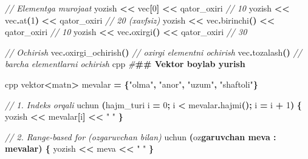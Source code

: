 \documentclass[a4paper,11pt,twoside,openright]{book}
\newenvironment{Shaded}{\begin{snugshade}}{\end{snugshade}}
\newcommand{\CharTok}[1]{\textcolor[rgb]{0.31,0.60,0.02}{#1}}
\newcommand{\CommentTok}[1]{\textcolor[rgb]{0.56,0.35,0.01}{\textit{#1}}}
\newcommand{\DecValTok}[1]{\textcolor[rgb]{0.00,0.00,0.81}{#1}}
\newcommand{\ErrorTok}[1]{\textcolor[rgb]{0.64,0.00,0.00}{\textbf{#1}}}
\newcommand{\NormalTok}[1]{#1}
\newcommand{\OperatorTok}[1]{\textcolor[rgb]{0.81,0.36,0.00}{\textbf{#1}}}
\newcommand{\PreprocessorTok}[1]{\textcolor[rgb]{0.56,0.35,0.01}{\textit{#1}}}
\newcommand{\StringTok}[1]{\textcolor[rgb]{0.31,0.60,0.02}{#1}}
\begin{document}
\begin{Shaded}
\begin{Highlighting}[]
\CommentTok{// Elementga murojaat}
\NormalTok{yozish }\OperatorTok{\textless{}\textless{}}\NormalTok{ vec}\OperatorTok{[}\DecValTok{0}\OperatorTok{]} \OperatorTok{\textless{}\textless{}}\NormalTok{ qator\_oxiri          }\CommentTok{// 10}
\NormalTok{yozish }\OperatorTok{\textless{}\textless{}}\NormalTok{ vec}\OperatorTok{.}\NormalTok{at}\OperatorTok{(}\DecValTok{1}\OperatorTok{)} \OperatorTok{\textless{}\textless{}}\NormalTok{ qator\_oxiri       }\CommentTok{// 20 (xavfsiz)}
\NormalTok{yozish }\OperatorTok{\textless{}\textless{}}\NormalTok{ vec}\OperatorTok{.}\NormalTok{birinchi}\OperatorTok{()} \OperatorTok{\textless{}\textless{}}\NormalTok{ qator\_oxiri  }\CommentTok{// 10}
\NormalTok{yozish }\OperatorTok{\textless{}\textless{}}\NormalTok{ vec}\OperatorTok{.}\NormalTok{oxirgi}\OperatorTok{()} \OperatorTok{\textless{}\textless{}}\NormalTok{ qator\_oxiri    }\CommentTok{// 30}

\CommentTok{// O\textquotesingle{}chirish}
\NormalTok{vec}\OperatorTok{.}\NormalTok{oxirgi\_ochirish}\OperatorTok{()}          \CommentTok{// oxirgi elementni o\textquotesingle{}chirish}
\NormalTok{vec}\OperatorTok{.}\NormalTok{tozalash}\OperatorTok{()}                 \CommentTok{// barcha elementlarni o\textquotesingle{}chirish}
\ErrorTok{\textasciigrave{}\textasciigrave{}\textasciigrave{}}\NormalTok{cpp}
\PreprocessorTok{\#}\ErrorTok{\#\# Vektor bo\textquotesingle{}ylab yurish}

\ErrorTok{\textasciigrave{}\textasciigrave{}\textasciigrave{}}\NormalTok{cpp}
\NormalTok{vektor}\OperatorTok{\textless{}}\NormalTok{matn}\OperatorTok{\textgreater{}}\NormalTok{ mevalar }\OperatorTok{=} \OperatorTok{\{}\StringTok{"olma"}\OperatorTok{,} \StringTok{"anor"}\OperatorTok{,} \StringTok{"uzum"}\OperatorTok{,} \StringTok{"shaftoli"}\OperatorTok{\}}

\CommentTok{// 1. Indeks orqali}
\NormalTok{uchun }\OperatorTok{(}\NormalTok{hajm\_turi i }\OperatorTok{=} \DecValTok{0}\OperatorTok{;}\NormalTok{ i }\OperatorTok{\textless{}}\NormalTok{ mevalar}\OperatorTok{.}\NormalTok{hajmi}\OperatorTok{();}\NormalTok{ i }\OperatorTok{=}\NormalTok{ i }\OperatorTok{+} \DecValTok{1}\OperatorTok{)} \OperatorTok{\{}
\NormalTok{    yozish }\OperatorTok{\textless{}\textless{}}\NormalTok{ mevalar}\OperatorTok{[}\NormalTok{i}\OperatorTok{]} \OperatorTok{\textless{}\textless{}} \StringTok{" "}
\OperatorTok{\}}

\CommentTok{// 2. Range{-}based for (o\textquotesingle{}zgaruvchan bilan)}
\NormalTok{uchun }\OperatorTok{(}\NormalTok{o}\CharTok{\textquotesingle{}z}\ErrorTok{garuvchan meva : mevalar) \{}
\NormalTok{    yozish }\OperatorTok{\textless{}\textless{}}\NormalTok{ meva }\OperatorTok{\textless{}\textless{}} \StringTok{" "}
\OperatorTok{\}}


\end{Highlighting}
\end{Shaded}
\end{document}
